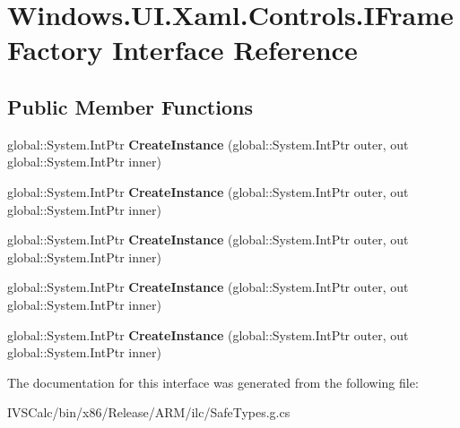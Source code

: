 \hypertarget{interface_windows_1_1_u_i_1_1_xaml_1_1_controls_1_1_i_frame_factory}{}\section{Windows.\+U\+I.\+Xaml.\+Controls.\+I\+Frame\+Factory Interface Reference}
\label{interface_windows_1_1_u_i_1_1_xaml_1_1_controls_1_1_i_frame_factory}
\subsection*{Public Member Functions}
\begin{DoxyCompactItemize}
\item 
\mbox{\label{interface_windows_1_1_u_i_1_1_xaml_1_1_controls_1_1_i_frame_factory_a57dcdece5b2da229373cf20e6fdc524c}} 
global\+::\+System.\+Int\+Ptr {\bfseries Create\+Instance} (global\+::\+System.\+Int\+Ptr outer, out global\+::\+System.\+Int\+Ptr inner)
\item 
\mbox{\label{interface_windows_1_1_u_i_1_1_xaml_1_1_controls_1_1_i_frame_factory_a57dcdece5b2da229373cf20e6fdc524c}} 
global\+::\+System.\+Int\+Ptr {\bfseries Create\+Instance} (global\+::\+System.\+Int\+Ptr outer, out global\+::\+System.\+Int\+Ptr inner)
\item 
\mbox{\label{interface_windows_1_1_u_i_1_1_xaml_1_1_controls_1_1_i_frame_factory_a57dcdece5b2da229373cf20e6fdc524c}} 
global\+::\+System.\+Int\+Ptr {\bfseries Create\+Instance} (global\+::\+System.\+Int\+Ptr outer, out global\+::\+System.\+Int\+Ptr inner)
\item 
\mbox{\label{interface_windows_1_1_u_i_1_1_xaml_1_1_controls_1_1_i_frame_factory_a57dcdece5b2da229373cf20e6fdc524c}} 
global\+::\+System.\+Int\+Ptr {\bfseries Create\+Instance} (global\+::\+System.\+Int\+Ptr outer, out global\+::\+System.\+Int\+Ptr inner)
\item 
\mbox{\label{interface_windows_1_1_u_i_1_1_xaml_1_1_controls_1_1_i_frame_factory_a57dcdece5b2da229373cf20e6fdc524c}} 
global\+::\+System.\+Int\+Ptr {\bfseries Create\+Instance} (global\+::\+System.\+Int\+Ptr outer, out global\+::\+System.\+Int\+Ptr inner)
\end{DoxyCompactItemize}


The documentation for this interface was generated from the following file\+:\begin{DoxyCompactItemize}
\item 
I\+V\+S\+Calc/bin/x86/\+Release/\+A\+R\+M/ilc/Safe\+Types.\+g.\+cs\end{DoxyCompactItemize}
